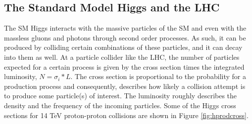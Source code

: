 \documentclass[12pt]{article}
\begin{document}

\subsection{The Standard Model Higgs and the LHC}

The SM Higgs interacts with the massive particles of the SM and even with the massless gluons and photons through second order processes. As such, it can be produced by colliding certain combinations of these particles, and it can decay into them as well. At a particle collider like the LHC, the number of particles expected for a certain process is given by the cross section times the integrated luminosity, $N = \sigma_i*L$. The cross section is proportional to the probability for a production process and consequently, describes how likely a collision attempt is to produce some particle(s) of interest. The luminosity roughly describes the density and the frequency of the incoming particles. Some of the Higgs cross sections for 14 TeV proton-proton collisions are shown in Figure \ref{fig:hprodcross}. 
\end{document}
